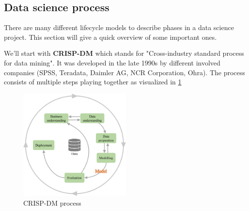
\subsection{Data science process}
There are many different lifecycle models to describe phases in a data science project. This section will give a quick overview of some important ones.

We'll start with \textbf{CRISP-DM} which stands for "Cross-industry standard process for data mining". It was developed in the late 1990s by different involved companies (SPSS, Teradata, Daimler AG, NCR Corporation, Ohra). The process consists of multiple steps playing together as visualized in \ref{fig:1_crisp_dm}

\begin{figure}[H]
  \centering
  \includegraphics[width=0.5\textwidth]{assets/basics/crisp-dm.png}
  \caption{CRISP-DM process}
  \label{fig:1_crisp_dm}
\end{figure}


